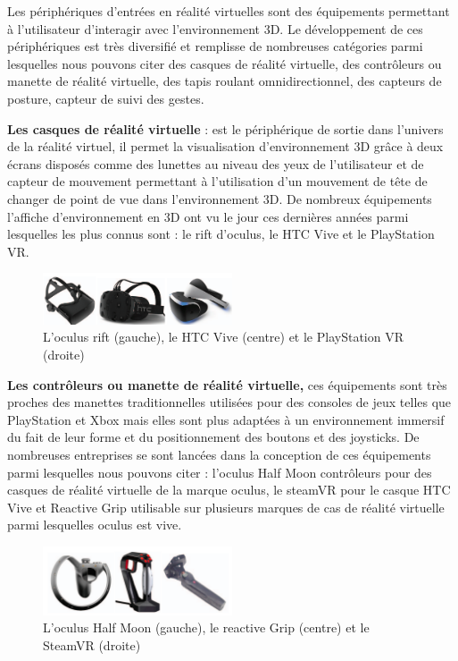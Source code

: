 Les périphériques d'entrées en réalité virtuelles sont des équipements permettant à l'utilisateur d'interagir avec l'environnement 3D.
Le développement de ces périphériques est très diversifié et remplisse de nombreuses catégories parmi lesquelles nous pouvons citer des casques de réalité virtuelle, des contrôleurs ou manette de réalité virtuelle, des tapis roulant omnidirectionnel, des capteurs de posture, capteur de suivi des gestes\cite{anthes2016state}.

\textbf{Les casques de réalité virtuelle} : est le périphérique de sortie dans l'univers de la réalité virtuel, il permet la visualisation d'environnement 3D grâce à deux écrans disposés comme des lunettes au niveau des yeux de l'utilisateur et de capteur de mouvement permettant à l'utilisation d'un mouvement de tête de changer de point de vue dans l'environnement 3D.
De nombreux équipements l'affiche d'environnement en 3D ont vu le jour ces dernières années parmi lesquelles les plus connus sont : le rift d'oculus, le HTC Vive et le PlayStation VR.

\begin{figure}[H]
	\centering
	\includegraphics[width=0.5\textwidth]{img/3dcs}
	\caption{L'oculus rift (gauche), le HTC Vive (centre) et le PlayStation VR (droite) }
\end{figure}

\textbf{Les contrôleurs ou manette de réalité virtuelle,} ces équipements sont très proches des manettes traditionnelles utilisées pour des consoles de jeux telles que PlayStation et Xbox mais elles sont plus adaptées à un environnement immersif du fait de leur forme et du positionnement des boutons et des joysticks.
De nombreuses entreprises se sont lancées dans la conception de ces équipements parmi lesquelles nous pouvons citer : l'oculus Half Moon contrôleurs pour des casques de réalité virtuelle de la marque oculus, le steamVR pour le casque HTC Vive et Reactive Grip utilisable sur plusieurs marques de cas de réalité virtuelle parmi lesquelles oculus est vive.

\begin{figure}[H]
	\centering
	\includegraphics[width=0.5\textwidth]{img/3dcon}
	\caption{L'oculus Half Moon (gauche), le reactive Grip (centre) et le SteamVR (droite) }
\end{figure}

